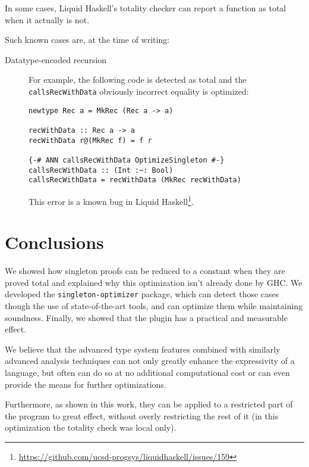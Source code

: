 In some cases, Liquid Haskell's totality checker can report a function as total when it actually is not.

Such known cases are, at the time of writing:

\begin{description}
  \item[Datatype-encoded recursion]
    For example, the following code is detected as total and the \texttt{callsRecWithData} obviously incorrect equality is optimized:
    \begin{lstlisting}
newtype Rec a = MkRec (Rec a -> a)

recWithData :: Rec a -> a
recWithData r@(MkRec f) = f r

{-# ANN callsRecWithData OptimizeSingleton #-}
callsRecWithData :: (Int :~: Bool)
callsRecWithData = recWithData (MkRec recWithData)
    \end{lstlisting}

   This error is a known bug in Liquid Haskell\footnote{\url{https://github.com/ucsd-progsys/liquidhaskell/issues/159}}.
\end{description}

\chapter{Conclusions}
\label{cha:conclusions}

We showed how singleton proofs can be reduced to a constant when they are proved total and explained why this optimization isn't already done by GHC.
We developed the \texttt{singleton-optimizer} package, which can detect those cases though the use of state-of-the-art tools, and can optimize them while maintaining soundness.
Finally, we showed that the plugin has a practical and measurable effect.

We believe that the advanced type system features combined with similarly advanced analysis techniques can not only greatly enhance the expressivity of a language, but often can do so at no additional computational cost or can even provide the means for further optimizations.

Furthermore, as shown in this work, they can be applied to a restricted part of the program to great effect, without overly restricting the rest of it (in this optimization the totality check was local only).


